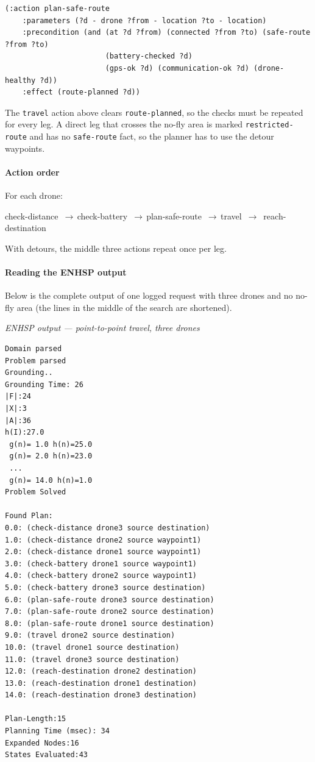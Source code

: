 \documentclass[11pt,a4paper,oneside]{report}
\newcommand{\code}[1]{\texttt{#1}}
\newcommand{\recordlabel}[1]{\par\smallskip\noindent\hspace*{1.2em}\textit{#1}\par}
\newcommand{\then}{\,{\color{amber!80!black}$\boldsymbol{\rightarrow}$}\allowbreak\,}
\newcommand{\actionflow}[1]{%
  \par\begin{tcolorbox}[colback=codebg,colframe=coderule,boxrule=0.4pt,arc=2pt,
      left=5pt,right=5pt,top=2pt,bottom=2pt,before skip=6pt,after skip=8pt]
    \footnotesize\ttfamily\raggedright\setstretch{1.25}#1
  \end{tcolorbox}}
\begin{document}
\begin{lstlisting}
(:action plan-safe-route
    :parameters (?d - drone ?from - location ?to - location)
    :precondition (and (at ?d ?from) (connected ?from ?to) (safe-route ?from ?to)
                       (battery-checked ?d)
                       (gps-ok ?d) (communication-ok ?d) (drone-healthy ?d))
    :effect (route-planned ?d))
\end{lstlisting}

\noindent The \code{travel} action above clears \code{route-planned}, so the checks must be
repeated for every leg. A direct leg that crosses the no-fly area is marked
\code{restricted-route} and has no \code{safe-route} fact, so the planner has to use the detour
waypoints.

\paragraph{Action order}
For each drone:
\actionflow{check-distance \then check-battery \then plan-safe-route \then travel \then
reach-destination}
With detours, the middle three actions repeat once per leg.

\paragraph{Reading the ENHSP output}
Below is the complete output of one logged request with three drones and no no-fly area (the
lines in the middle of the search are shortened).

\recordlabel{ENHSP output --- point-to-point travel, three drones}
\begin{lstlisting}[style=plain]
Domain parsed
Problem parsed
Grounding..
Grounding Time: 26
|F|:24
|X|:3
|A|:36
h(I):27.0
 g(n)= 1.0 h(n)=25.0
 g(n)= 2.0 h(n)=23.0
 ...
 g(n)= 14.0 h(n)=1.0
Problem Solved

Found Plan:
0.0: (check-distance drone3 source destination)
1.0: (check-distance drone2 source waypoint1)
2.0: (check-distance drone1 source waypoint1)
3.0: (check-battery drone1 source waypoint1)
4.0: (check-battery drone2 source waypoint1)
5.0: (check-battery drone3 source destination)
6.0: (plan-safe-route drone3 source destination)
7.0: (plan-safe-route drone2 source destination)
8.0: (plan-safe-route drone1 source destination)
9.0: (travel drone2 source destination)
10.0: (travel drone1 source destination)
11.0: (travel drone3 source destination)
12.0: (reach-destination drone2 destination)
13.0: (reach-destination drone1 destination)
14.0: (reach-destination drone3 destination)

Plan-Length:15
Planning Time (msec): 34
Expanded Nodes:16
States Evaluated:43
\end{lstlisting}
\end{document}
